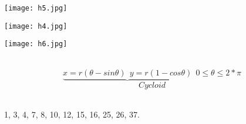 \underline{\large\textbf{\color{smalt(darkpowderblue)}{Cycloid}}}
\noindent\begin{minipage}{0.3\textwidth}
\texttt{[image: h5.jpg]}
\end{minipage}
\noindent\begin{minipage}{0.3\textwidth}
\texttt{[image: h4.jpg]}
\end{minipage}
\noindent\begin{minipage}{0.3\textwidth}
\texttt{[image: h6.jpg]}
\end{minipage}\\
\hspace*{1.8cm}$$\underbrace{x=r(\theta-sin\theta)~~y=r(1-cos\theta)}~ ~0 \leq \theta \leq 2*\pi$$
$$Cycloid$$\\
\noindent{\color{smalt(darkpowderblue)}\rule{\linewidth}{.2mm}}
\begin{problem}
1, 3, 4, 7, 8, 10, 12, 15, 16, 25, 26, 37.
\end{problem}
